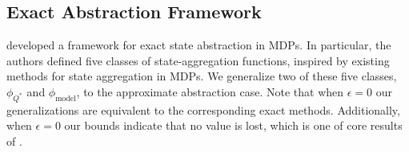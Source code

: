 \subsection{Exact Abstraction Framework}

\citet{li2006towards} developed a framework for exact state abstraction in \acp{MDP}. In particular, the authors defined five classes of state-aggregation functions, inspired by existing methods for state aggregation in \acp{MDP}. We generalize two of these five classes, $\phi_{Q^*}$ and $\phi_{\text{model}}$, to the approximate abstraction case. Note that when $\epsilon=0$ our generalizations are equivalent to the corresponding exact methods. Additionally, when $\epsilon=0$ our bounds indicate that no value is lost, which is one of core results of \citet{li2006towards}.

